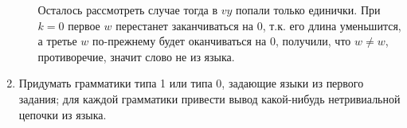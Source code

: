 \documentclass[fleqn]{article}
\begin{document}
\begin{enumerate}
\begin{enumerate}
		Осталось рассмотреть случае тогда в $vy$ попали только единички. При $k = 0$ первое $w$ перестанет 
		заканчиваться на $0$, т.к. его длина уменьшится, а третье $w$ по-прежнему будет оканчиваться на $0$, получили, 
		что $w \neq w$, противоречие, значит слово не из языка.
	\end{enumerate}
	
\item Придумать грамматики типа 1 или типа 0, задающие языки из первого задания; для каждой грамматики привести 
вывод какой-нибудь нетривиальной цепочки из языка.

\end{enumerate}
\end{document}
